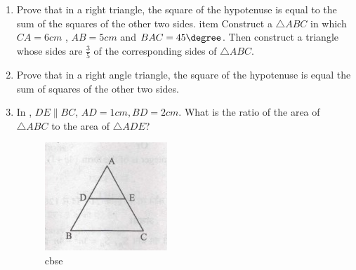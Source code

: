 \begin{enumerate}
\item Prove that in a right triangle, the square of the hypotenuse is equal to the sum of the squares of the other two sides.
item Construct a $\triangle ABC$ in which $CA = 6cm$ , $AB = 5cm$ and $BAC= 45\degree$. Then  construct a triangle whose sides are $\frac{3}{5}$ of the corresponding sides of $\triangle ABC$.
\item Prove that in a right angle triangle, the square of the hypotenuse is equal the sum of squares of the other two sides.
\item In , $DE \parallel BC$, $ AD = 1 cm , BD = 2 cm$. What is the ratio of the area of $\triangle ABC$ to the area of $\triangle ADE$?
\begin{figure}[H]
			\centering
			\includegraphics[width=\columnwidth]{figs/tri123.jpeg}
			\caption{cbse}
			\label{fig:triangle1__ABD}
			

\end{figure}
\end{enumerate}
